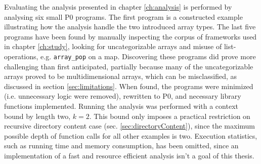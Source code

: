


Evaluating the analysis presented in chapter \ref{ch:analysis} is performed by analysing six small P0 programs. The first program is a constructed example illustrating how the analysis handle the two introduced array types. The last five programs have been found by manually inspecting the corpus of frameworks used in chapter \ref{ch:study}, looking for uncategorizable arrays and misuse of list-operations, e.g. \texttt{array\_pop} on a map. Discovering these programs did prove more challenging than first anticipated, partially because many of the uncategorizable arrays proved to be multidimensional arrays, which can be misclassified, as discussed in section \ref{sec:limitations}. When found, the programs were minimized (i.e. unnecessary logic were removed), rewritten to P0, and necessary library functions implemented. Running the analysis was performed with a context bound by length two, $k=2$. This bound only imposes a practical restriction on recursive directory content case (sec. \ref{sec:directoryContent}), since the maximum possible depth of function calls for all other examples is two. Execution statistics, such as running time and memory consumption, has been omitted, since an implementation of a fast and resource efficient analysis isn't a goal of this thesis.  


